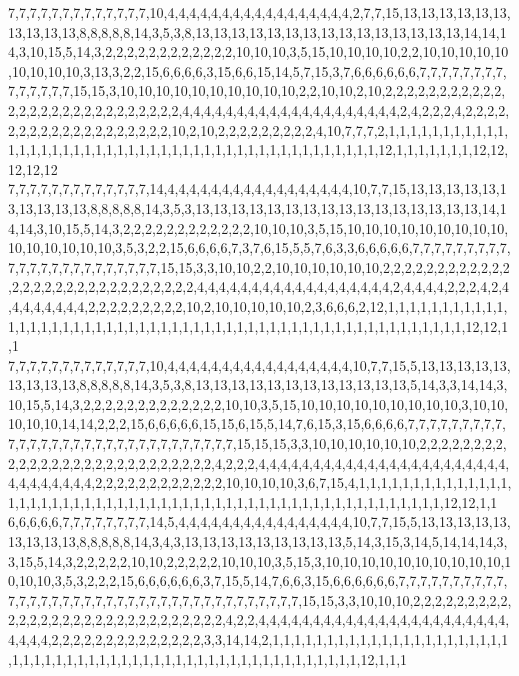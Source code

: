 7,7,7,7,7,7,7,7,7,7,7,7,7,10,4,4,4,4,4,4,4,4,4,4,4,4,4,4,4,4,4,2,7,7,15,13,13,13,13,13,13,13,13,13,13,8,8,8,8,8,14,3,5,3,8,13,13,13,13,13,13,13,13,13,13,13,13,13,13,13,14,14,14,3,10,15,5,14,3,2,2,2,2,2,2,2,2,2,2,2,2,10,10,10,3,5,15,10,10,10,10,2,2,10,10,10,10,10,10,10,10,10,3,13,3,2,2,15,6,6,6,6,3,15,6,6,15,14,5,7,15,3,7,6,6,6,6,6,6,7,7,7,7,7,7,7,7,7,7,7,7,7,7,15,15,3,10,10,10,10,10,10,10,10,10,10,2,2,10,10,2,10,2,2,2,2,2,2,2,2,2,2,2,2,2,2,2,2,2,2,2,2,2,2,2,2,2,2,2,4,4,4,4,4,4,4,4,4,4,4,4,4,4,4,4,4,4,4,4,2,4,2,2,2,4,2,2,2,2,2,2,2,2,2,2,2,2,2,2,2,2,2,2,2,10,2,10,2,2,2,2,2,2,2,2,2,4,10,7,7,7,2,1,1,1,1,1,1,1,1,1,1,1,1,1,1,1,1,1,1,1,1,1,1,1,1,1,1,1,1,1,1,1,1,1,1,1,1,1,1,1,1,1,1,1,1,1,12,1,1,1,1,1,1,1,12,12,12,12,12
7,7,7,7,7,7,7,7,7,7,7,7,7,14,4,4,4,4,4,4,4,4,4,4,4,4,4,4,4,4,4,10,7,7,15,13,13,13,13,13,13,13,13,13,13,8,8,8,8,8,14,3,5,3,13,13,13,13,13,13,13,13,13,13,13,13,13,13,13,13,14,14,14,3,10,15,5,14,3,2,2,2,2,2,2,2,2,2,2,2,2,10,10,10,3,5,15,10,10,10,10,10,10,10,10,10,10,10,10,10,10,10,3,5,3,2,2,15,6,6,6,6,7,3,7,6,15,5,5,7,6,3,3,6,6,6,6,6,7,7,7,7,7,7,7,7,7,7,7,7,7,7,7,7,7,7,7,7,7,7,7,15,15,3,3,10,10,2,2,10,10,10,10,10,10,2,2,2,2,2,2,2,2,2,2,2,2,2,2,2,2,2,2,2,2,2,2,2,2,2,2,2,2,2,4,4,4,4,4,4,4,4,4,4,4,4,4,4,4,4,4,4,2,4,4,4,4,2,2,2,4,2,4,4,4,4,4,4,4,4,2,2,2,2,2,2,2,2,2,10,2,10,10,10,10,10,2,3,6,6,6,2,12,1,1,1,1,1,1,1,1,1,1,1,1,1,1,1,1,1,1,1,1,1,1,1,1,1,1,1,1,1,1,1,1,1,1,1,1,1,1,1,1,1,1,1,1,1,1,1,1,1,1,1,1,1,12,12,1,1
7,7,7,7,7,7,7,7,7,7,7,7,7,10,4,4,4,4,4,4,4,4,4,4,4,4,4,4,4,4,4,10,7,7,15,5,13,13,13,13,13,13,13,13,13,8,8,8,8,8,14,3,5,3,8,13,13,13,13,13,13,13,13,13,13,13,13,5,14,3,3,14,14,3,10,15,5,14,3,2,2,2,2,2,2,2,2,2,2,2,2,2,10,10,3,5,15,10,10,10,10,10,10,10,10,10,3,10,10,10,10,10,14,14,2,2,2,15,6,6,6,6,6,15,15,6,15,5,14,7,6,15,3,15,6,6,6,6,7,7,7,7,7,7,7,7,7,7,7,7,7,7,7,7,7,7,7,7,7,7,7,7,7,7,7,7,7,7,15,15,15,3,3,10,10,10,10,10,10,2,2,2,2,2,2,2,2,2,2,2,2,2,2,2,2,2,2,2,2,2,2,2,2,2,2,2,4,2,2,2,4,4,4,4,4,4,4,4,4,4,4,4,4,4,4,4,4,4,4,4,4,4,4,4,4,4,4,4,4,4,4,2,2,2,2,2,2,2,2,2,2,2,2,10,10,10,10,3,6,7,15,4,1,1,1,1,1,1,1,1,1,1,1,1,1,1,1,1,1,1,1,1,1,1,1,1,1,1,1,1,1,1,1,1,1,1,1,1,1,1,1,1,1,1,1,1,1,1,1,1,1,1,1,1,1,1,12,12,1,1
6,6,6,6,6,7,7,7,7,7,7,7,7,14,5,4,4,4,4,4,4,4,4,4,4,4,4,4,4,4,4,10,7,7,15,5,13,13,13,13,13,13,13,13,13,8,8,8,8,8,14,3,4,3,13,13,13,13,13,13,13,13,13,5,14,3,15,3,14,5,14,14,14,3,3,15,5,14,3,2,2,2,2,2,10,10,2,2,2,2,2,10,10,10,3,5,15,3,10,10,10,10,10,10,10,10,10,10,10,10,10,3,5,3,2,2,2,15,6,6,6,6,6,6,3,7,15,5,14,7,6,6,3,15,6,6,6,6,6,6,7,7,7,7,7,7,7,7,7,7,7,7,7,7,7,7,7,7,7,7,7,7,7,7,7,7,7,7,7,7,7,7,7,7,7,7,7,15,15,3,3,10,10,10,2,2,2,2,2,2,2,2,2,2,2,2,2,2,2,2,2,2,2,2,2,2,2,2,2,2,2,2,2,4,2,2,4,4,4,4,4,4,4,4,4,4,4,4,4,4,4,4,4,4,4,4,4,4,4,4,4,4,4,2,2,2,2,2,2,2,2,2,2,2,2,2,2,3,3,14,14,2,1,1,1,1,1,1,1,1,1,1,1,1,1,1,1,1,1,1,1,1,1,1,1,1,1,1,1,1,1,1,1,1,1,1,1,1,1,1,1,1,1,1,1,1,1,1,1,1,1,1,1,1,1,1,12,1,1,1
